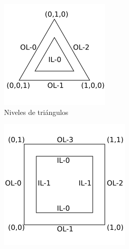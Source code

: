 \begin{figure}[t]
	\centering
	\begin{subfigure}{.45\textwidth}
		\includegraphics[width=\textwidth]{figures/TriangleLevels.png}	
		\caption{Niveles de triángulos}
		\label{fig:trilevels}
	\end{subfigure}
	\hfill
	\begin{subfigure}{.45\textwidth}
		\includegraphics[width=\textwidth]{figures/QuadLevels.png}	

\end{subfigure}
\end{figure}
